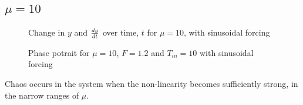 \documentclass{article}
\begin{document}
\subsection{$\mu=10$}
\begin{figure}[H]
\centering 
\noindent{}%
\caption{Change in $y$ and $dy \over dt$  over time, $t$ for $\mu=10$, with sinusoidal forcing}
\end{figure}
\begin{figure}[H]
\centering 
\noindent{}%
\caption{Phase potrait for $\mu=10$, $F=1.2$ and $T_{in}=10$ with sinusoidal forcing}
\end{figure}
Chaos occurs in the system when the non-linearity becomes sufficiently strong, in the narrow ranges of $\mu$. 
\end{document}
